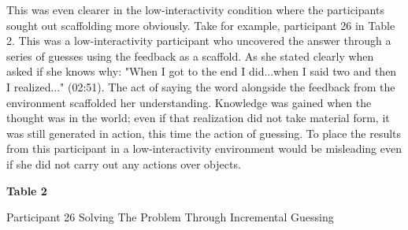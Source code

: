 This was even clearer in the low-interactivity condition where the
participants sought out scaffolding more obviously. Take for example,
participant 26 in Table 2. This was a low-interactivity participant who
uncovered the answer through a series of guesses using the feedback as a
scaffold. As she stated clearly when asked if she knows why: "When I got
to the end I did...when I said two and then I realized..." (02:51). The
act of saying the word alongside the feedback from the environment
scaffolded her understanding. Knowledge was gained when the thought was
in the world; even if that realization did not take material form, it
was still generated in action, this time the action of guessing. To
place the results from this participant in a low-interactivity
environment would be misleading even if she did not carry out any
actions over objects.

\textbf{Table 2}

Participant 26 Solving The Problem Through Incremental Guessing

